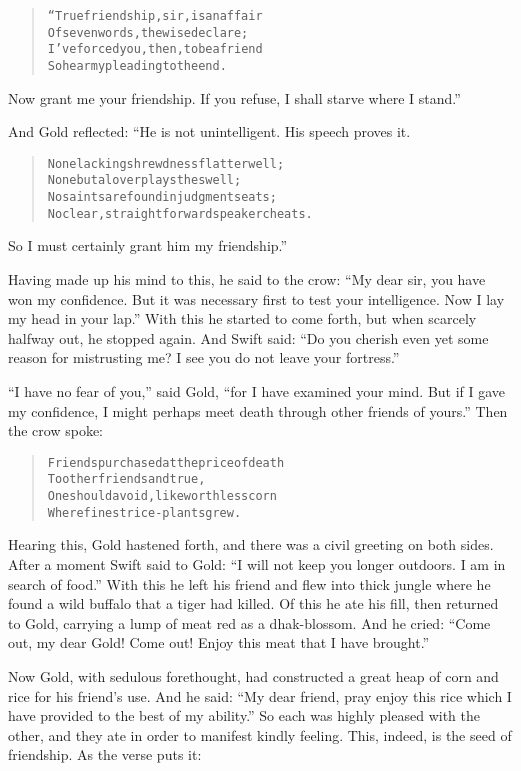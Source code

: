 \documentclass[article, twoside, 14pt]{memoir}
\renewenvironment{verbatim}{%
\begin{quote}%
\vskip -10pt%
\begin{alltt}\normalfont\large}{\end{alltt}%
\end{quote}%
\vskip -10pt
} %
\begin{document}
\begin{verbatim}
“True friendship, sir, is an affair
Of seven words, the wise declare;
I've forced you, then, to be a friend{\textemdash}
So hear my pleading to the end.
\end{verbatim}
Now grant me your friendship. If you refuse, I shall starve where I
stand.”

And Gold reflected: “He is not unintelligent. His speech proves
it.

\begin{verbatim}
None lacking shrewdness flatter well;
None but a lover plays the swell;
No saints are found in judgment seats;
No clear, straightforward speaker cheats.
\end{verbatim}
So I must certainly grant him my friendship.”

Having made up his mind to this, he said to the crow:
``My dear sir, you have won my confidence. But it was necessary first to test your intelligence. Now I lay my head in your lap.''
With this he started to come forth, but when scarcely halfway out,
he stopped again. And Swift said:
``Do you cherish even yet some reason for mistrusting me? I see you do not leave your fortress.''

``I have no fear of you,'' said Gold,
``for I have examined your mind. But if I gave my confidence, I might perhaps meet death through other friends of yours.''
Then the crow spoke:

\begin{verbatim}
Friends purchased at the price of death
    To other friends and true,
One should avoid, like worthless corn
    Where finest rice-plants grew.
\end{verbatim}
Hearing this, Gold hastened forth, and there was a civil greeting
on both sides. After a moment Swift said to Gold:
``I will not keep you longer outdoors. I am in search of food.''
With this he left his friend and flew into thick jungle where he
found a wild buffalo that a tiger had killed. Of this he ate his
fill, then returned to Gold, carrying a lump of meat red as a
dhak-blossom. And he cried:
``Come out, my dear Gold! Come out! Enjoy this meat that I have brought.''

Now Gold, with sedulous forethought, had constructed a great heap
of corn and rice for his friend's use. And he said:
``My dear friend, pray enjoy this rice which I have provided to the best of my ability.''
So each was highly pleased with the other, and they ate in order to
manifest kindly feeling. This, indeed, is the seed of friendship.
As the verse puts it:
\end{document}
